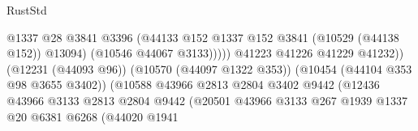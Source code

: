 \begin{lexlean}{RustStd}
\begin{coremodule}
                                                            @1337
                                                            @28
                                                            @3841
                                                            @3396
                                                            (@44133
                                                              @152
                                                              @1337
                                                              @152
                                                              @3841
                                                              (@10529 (@44138 @152))
                                                              @13094)
                                                            (@10546 @44067 @3133)))))
                                                    @41223
                                                    @41226
                                                    @41229
                                                    @41232))
                                                (@12231 (@44093 @96))
                                                (@10570 (@44097 @1322 @353))
                                                (@10454 (@44104 @353 @98 @3655 @3402))
                                                (@10588
                                                  @43966
                                                  @2813
                                                  @2804
                                                  @3402
                                                  @9442
                                                  (@12436
                                                    @43966
                                                    @3133
                                                    @2813
                                                    @2804
                                                    @9442
                                                    (@20501
                                                      @43966
                                                      @3133
                                                      @267
                                                      @1939
                                                      @1337
                                                      @20
                                                      @6381
                                                      @6268
                                                      (@44020
                                                        @1941

\end{coremodule}
\end{lexlean}
